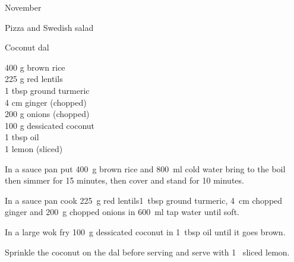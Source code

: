 \begin{menu}{November}
\begin{recipe}{1}{Pizza and Swedish salad}
\begin{instructions}
    \end{instructions}
    \end{recipe}%
  
    \begin{recipe}{2}{Coconut dal}%
		\begin{ingredients}
		400 g brown rice  \\
	225 g red lentils  \\
	1 tbsp ground turmeric  \\
	4 cm ginger (chopped) \\
	200 g onions (chopped) \\
	100 g dessicated coconut  \\
	1 tbsp oil  \\
	1  lemon (sliced) \\
	
		\end{ingredients}
	
    \begin{instructions}
    \item 
      In a
      sauce pan
      put
      400~g  brown rice
      and
      800~ml  cold water
      bring to the boil then simmer for 15 minutes,
      then cover and stand for 10 minutes.
    \item 
        In a sauce pan cook
        225~g  red lentils1~tbsp  ground turmeric,
        4~cm chopped ginger
        and
        200~g chopped onions
        in
        600~ml  tap water
        until soft.
      \item 
        In a large wok fry
        100~g  dessicated coconut
        in
        1~tbsp  oil
        until it goes brown.
      \item 
        Sprinkle the coconut on the dal
        before serving
        and
        serve with
        1~ sliced lemon.
      
    \end{instructions}
    \end{recipe}%
  
    \clearpage
    \end{menu}
	
